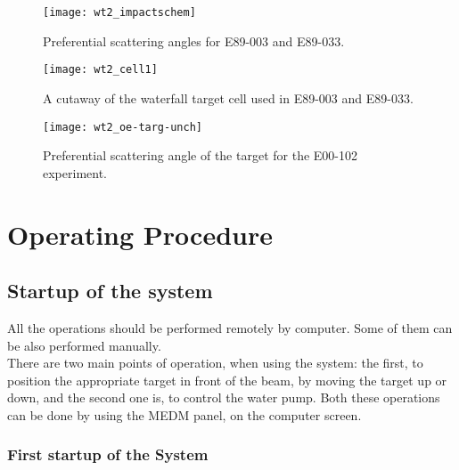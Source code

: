 %
\begin{figure}
\begin{center}\texttt{[image: wt2\_impactschem]}\end{center}


\caption{Preferential scattering angles for E89-003 and E89-033.}

\label{fig:wt_impact}
\end{figure}


%
\begin{figure}
\begin{center}\texttt{[image: wt2\_cell1]}\end{center}


\caption{A cutaway of the waterfall target cell used in E89-003 and E89-033.}

\label{fig:wt_cell1}
\end{figure}


%
\begin{figure}
\begin{center}\texttt{[image: wt2\_oe-targ-unch]}\end{center}


\caption{Preferential scattering angle of the target for the E00-102 experiment.}

\label{fig:wt_oee-kin}
\end{figure}


\section{Operating Procedure}


\subsection{Startup of the system}

All the operations should be performed remotely by computer. Some
of them can be also performed manually.\\
 There are two main points of operation, when using the system: the
first, to position the appropriate target in front of the beam, by
moving the target up or down, and the second one is, to control the
water pump. Both these operations can be done by using the MEDM panel,
on the computer screen.


\subsubsection{First startup of the System}

